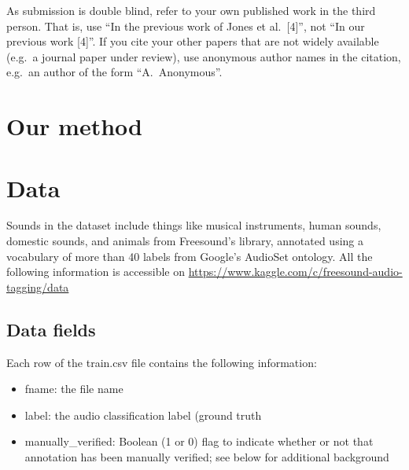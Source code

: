 \documentclass{article} %
\begin{document}
	As submission is double blind, refer to your own published work in the 
	third person. That is, use ``In the previous work of Jones et al.\ [4]'',
	not ``In our previous work [4]''. If you cite your other papers that
	are not widely available (e.g.\ a journal paper under review), use
	anonymous author names in the citation, e.g.\ an author of the
	form ``A.\ Anonymous''. 

\section{Our method}

\section{Data}
	Sounds in the dataset include things like musical instruments, human sounds, domestic sounds, and animals from Freesound’s library, annotated using a vocabulary of more than 40 labels from Google’s AudioSet ontology. All the following information is accessible on \url{https://www.kaggle.com/c/freesound-audio-tagging/data}

	\subsection{Data fields}
		Each row of the train.csv file contains the following information:
			\begin{itemize}
			    \item fname: the file name
			    \item label: the audio classification label (ground truth
			    \item manually\_verified: Boolean (1 or 0) flag to indicate whether or not that annotation has been manually verified; see below for additional background
			\end{itemize}
\end{document}
